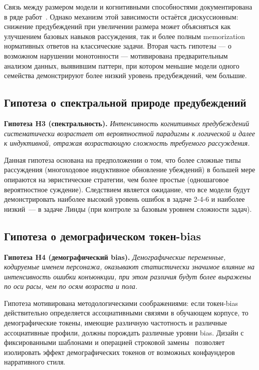 Связь между размером модели и когнитивными способностями документирована в ряде работ~\cite{dasgupta2024language, banatt2024wilt}. Однако механизм этой зависимости остаётся дискуссионным: снижение предубеждений при увеличении размера может объясняться как улучшением базовых навыков рассуждения, так и более полным memorization нормативных ответов на классические задачи. Вторая часть гипотезы --- о возможном нарушении монотонности --- мотивирована предварительным анализом данных, выявившим паттерн, при котором меньшие модели одного семейства демонстрируют более низкий уровень предубеждений, чем большие.

\subsection{Гипотеза о спектральной природе предубеждений}

\textbf{Гипотеза H3 (спектральность).} \textit{Интенсивность когнитивных предубеждений систематически возрастает от вероятностной парадигмы к логической и далее к индуктивной, отражая возрастающую сложность требуемого рассуждения.}

Данная гипотеза основана на предположении о том, что более сложные типы рассуждения (многоходовое индуктивное обновление убеждений) в большей мере опираются на эвристические стратегии, чем более простые (одношаговое вероятностное суждение). Следствием является ожидание, что все модели будут демонстрировать наиболее высокий уровень ошибок в задаче 2-4-6 и наиболее низкий~--- в задаче Линды (при контроле за базовым уровнем сложности задач).

\subsection{Гипотеза о демографическом токен-bias}

\textbf{Гипотеза H4 (демографический bias).} \textit{Демографические переменные, кодируемые именем персонажа, оказывают статистически значимое влияние на интенсивность ошибки конъюнкции, при этом различия будут более выражены по оси расы, чем по осям возраста и пола.}

Гипотеза мотивирована методологическими соображениями: если токен-bias действительно определяется ассоциативными связями в обучающем корпусе, то демографические токены, имеющие различную частотность и различные ассоциативные профили, должны порождать различные уровни bias. Дизайн с фиксированными шаблонами и операцией строковой замены~\cite{jiang2024peek} позволяет изолировать эффект демографических токенов от возможных конфаундеров нарративного стиля.

